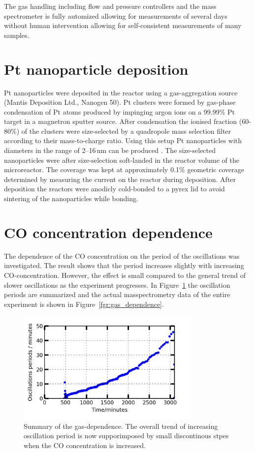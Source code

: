 \documentclass[8.5pt,twoside,twocolumn]{article}
\begin{document}
The gas handling including flow and pressure controllers and the mass spectrometer is fully automized allowing for measurements of several days without human intervention allowing for self-consistent measurements of many samples.

\section{Pt nanoparticle deposition}
Pt nanoparticles were deposited in the reactor using a gas-aggregation source (Mantis Deposition Ltd., Nanogen 50). Pt clusters were formed by gas-phase condensation of Pt atoms produced by impinging argon ions on a 99.99\% Pt target in a magnetron sputter source. After condensation the ionised fraction (60-80\%) of the clusters were size-selected by a quadropole mass selection filter according to their mass-to-charge ratio. Using this setup Pt nanoparticles with diameters in the range of 2--16\,nm can be produced \cite{Nielsen2010,Nielsen2009}. The size-selected nanoparticles were after size-selection soft-landed in the reactor volume of the microreactor. The coverage was kept at approximately 0.1\% geometric coverage determined by measuring the current on the reactor during deposition. After deposition the reactors were anodicly cold-bonded \cite{Vesborg2010} to a pyrex lid to avoid sintering of the nanoparticles while bonding.

\section{CO concentration dependence}
The dependence of the CO concentration on the period of the oscillations was investigated. The result shows that the period increases slightly with increasing CO-concentration. However, the effect is small compared to the general trend of slower oscillations as the experiment progresses. In Figure~\ref{fgr:gas_dependence_summary} the oscillation periods are summarized and the actual masspectrometry data of the entire experiment is shown in Figure~\ref{fgr:gas_dependence}.

\begin{figure}[h]
  \centering
  \includegraphics[width=9cm]{oscillations_gas_dependence_summary_supplemental.png}
  \caption{Summary of the gas-dependence. The overall trend of increasing oscillation period is now supporimposed by small discontinous stpes when the CO concentration is increased.}
  \label{fgr:gas_dependence_summary}
\end{figure}
\end{document}
